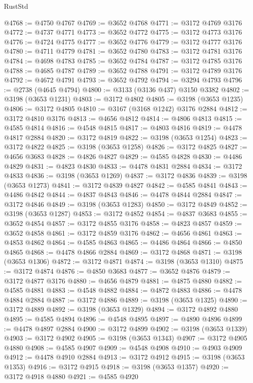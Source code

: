 \begin{lexlean}{RustStd}
\begin{coremodule}
@4768 := @4750 @4767
@4769 := @3652 @4768
@4771 := @3172 @4769 @3176
@4772 := @4737 @4771
@4773 := @3652 @4772
@4775 := @3172 @4773 @3176
@4776 := @4724 @4775
@4777 := @3652 @4776
@4779 := @3172 @4777 @3176
@4780 := @4711 @4779
@4781 := @3652 @4780
@4783 := @3172 @4781 @3176
@4784 := @4698 @4783
@4785 := @3652 @4784
@4787 := @3172 @4785 @3176
@4788 := @4685 @4787
@4789 := @3652 @4788
@4791 := @3172 @4789 @3176
@4792 := @4672 @4791
@4793 := @3652 @4792
@4794 := @3294 @4793
@4796 := @2738 (@4645 @4794)
@4800 := @3133 (@3136 @437) @3150 @3382
@4802 := @3198 (@3653 @1231)
@4803 := @3172 @4802
@4805 := @3198 (@3653 @1235)
@4806 := @3172 @4805
@4810 := @3167 (@3168 @1242) @3176 @2884
@4812 := @3172 @4810 @3176
@4813 := @4656 @4812
@4814 := @4806 @4813
@4815 := @4585 @4814
@4816 := @4548 @4815
@4817 := @4803 @4816
@4819 := @4478 @4817 @2884
@4820 := @3172 @4819
@4822 := @3198 (@3653 @1254)
@4823 := @3172 @4822
@4825 := @3198 (@3653 @1258)
@4826 := @3172 @4825
@4827 := @4656 @3683
@4828 := @4826 @4827
@4829 := @4585 @4828
@4830 := @4486 @4829
@4831 := @4823 @4830
@4833 := @4478 @4831 @2884
@4834 := @3172 @4833
@4836 := @3198 (@3653 @1269)
@4837 := @3172 @4836
@4839 := @3198 (@3653 @1273)
@4841 := @3172 @4839 @4827
@4842 := @4585 @4841
@4843 := @4486 @4842
@4844 := @4837 @4843
@4846 := @4478 @4844 @2884
@4847 := @3172 @4846
@4849 := @3198 (@3653 @1283)
@4850 := @3172 @4849
@4852 := @3198 (@3653 @1287)
@4853 := @3172 @4852
@4854 := @4837 @3683
@4855 := @3652 @4854
@4857 := @3172 @4855 @3176
@4858 := @4823 @4857
@4859 := @3652 @4858
@4861 := @3172 @4859 @3176
@4862 := @4656 @4861
@4863 := @4853 @4862
@4864 := @4585 @4863
@4865 := @4486 @4864
@4866 := @4850 @4865
@4868 := @4478 @4866 @2884
@4869 := @3172 @4868
@4871 := @3198 (@3653 @1306)
@4872 := @3172 @4871
@4874 := @3198 (@3653 @1310)
@4875 := @3172 @4874
@4876 := @4850 @3683
@4877 := @3652 @4876
@4879 := @3172 @4877 @3176
@4880 := @4656 @4879
@4881 := @4875 @4880
@4882 := @4585 @4881
@4883 := @4548 @4882
@4884 := @4872 @4883
@4886 := @4478 @4884 @2884
@4887 := @3172 @4886
@4889 := @3198 (@3653 @1325)
@4890 := @3172 @4889
@4892 := @3198 (@3653 @1329)
@4894 := @3172 @4892 @4880
@4895 := @4585 @4894
@4896 := @4548 @4895
@4897 := @4890 @4896
@4899 := @4478 @4897 @2884
@4900 := @3172 @4899
@4902 := @3198 (@3653 @1339)
@4903 := @3172 @4902
@4905 := @3198 (@3653 @1343)
@4907 := @3172 @4905 @4880
@4908 := @4585 @4907
@4909 := @4548 @4908
@4910 := @4903 @4909
@4912 := @4478 @4910 @2884
@4913 := @3172 @4912
@4915 := @3198 (@3653 @1353)
@4916 := @3172 @4915
@4918 := @3198 (@3653 @1357)
@4920 := @3172 @4918 @4880
@4921 := @4585 @4920

\end{coremodule}
\end{lexlean}
